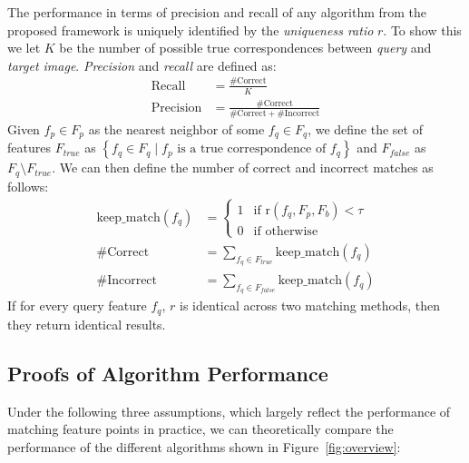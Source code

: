 \documentclass[review]{elsarticle}
\newcommand{\twopartdef}[4]
{
	\left\{
		\begin{array}{ll}
			#1 & \mbox{if } #2 \\
			#3 & \mbox{if } #4
		\end{array}
	\right.
}
\begin{document}
The performance in terms of precision and recall of any algorithm from the proposed framework is uniquely identified by the \emph{uniqueness ratio} $r$. To show this we let $K$ be the number of possible true correspondences between \emph{query} and \emph{target image}. \emph{Precision} and \emph{recall} are defined as:
\begin{align*}
    \textrm{Recall} &= \frac{\#\textrm{Correct}}{K} \\
    \textrm{Precision} &= \frac{\#\textrm{Correct}}{\#\textrm{Correct} + \#\textrm{Incorrect}}
\end{align*}
Given $f_{p} \in F_{p}$ as the nearest neighbor of some $f_q \in F_{q}$, we define the set of features $F_{true}$ as $\left\{ f_{q} \in F_{q} \mid f_{p} \text{ is a true correspondence of } f_{q} \right\}$ and $F_{false}$ as $F_{q} \setminus F_{true}$.  We can then define the number of correct and incorrect matches as follows:
\begin{align*}
    \textrm{keep\_match}(f_{q}) &= \twopartdef{ 1 }{\text{r}(f_{q}, 
    F_{p}, F_{b}) <
    \tau}{0}{\textrm{otherwise}} \\
    \#\textrm{Correct} &= \sum_{f_{q} \in F_{true}} 
    \textrm{keep\_match}(f_{q})\\
    \#\textrm{Incorrect} &= \sum_{f_{q} \in F_{false}}
    \textrm{keep\_match}(f_{q})
\end{align*}
If for every query feature $f_{q}$, $r$ is identical across two matching methods, then they return identical results. 

\subsection{Proofs of Algorithm Performance}
\label{S:Proofs}

Under the following three assumptions, which largely reflect the performance of matching feature points in practice, we can theoretically compare the performance of the different algorithms shown in Figure~\ref{fig:overview}:
\end{document}
